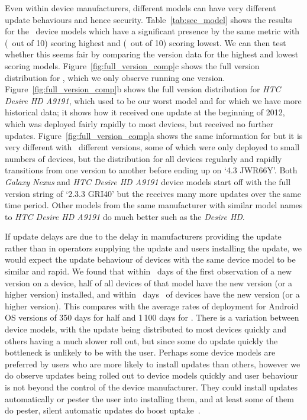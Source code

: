 Even within device manufacturers, different models can have very different update behaviours and hence security.
Table~\ref{tab:sec_model} shows the results for the \daNumSigModels\ device models which have a significant presence by the same metric with \emph{\daSecScoreBestmodel} (\daSecScoreBestmodelScore\ out of 10) scoring highest and \emph{\daSecScoreWorstmodel} (\daSecScoreWorstmodelScore\ out of 10) scoring lowest.
We can then test whether this seems fair by comparing the version data for the highest and lowest scoring models.
Figure~\ref{fig:full_version_comp}c shows the full version distribution for \emph{\daSecScoreWorstmodel}, which we only observe running one version.
Figure~\ref{fig:full_version_comp}b shows the full version distribution for \emph{HTC Desire HD A9191}, which used to be our worst model and for which we have more historical data; it shows how it received one update at the beginning of 2012, which was deployed fairly rapidly to most devices, but received no further updates.
Figure~\ref{fig:full_version_comp}a shows the same information for \emph{\daSecScoreBestmodel} but it is very different with \daSecScoreBestmodelNumFullVersions\ different versions, some of which were only deployed to small numbers of devices, but the distribution for all devices regularly and rapidly transitions from one version to another before ending up on `4.3 JWR66Y'.
Both \emph{Galaxy Nexus} and \emph{HTC Desire HD A9191} device models start off with the full version string of `2.3.3 GRI40' but the \emph{\daSecScoreBestmodel} receives many more updates over the same time period.
Other models from the same manufacturer with similar model names to \emph{HTC Desire HD A9191} do much better such as the \emph{Desire HD}.

If update delays are due to the delay in manufacturers providing the update rather than in operators supplying the update and users installing the update, we would expect the update behaviour of devices with the same device model to be similar and rapid.
We found that within \daModelHalfDeployment\ days of the first observation of a new version on a device, half of all devices of that model have the new version (or a higher version) installed, and within \daModelFullDeployment\ days \daFullDeployedAt\ of devices have the new version (or a higher version).
This compares with the average rates of deployment for Android OS versions of 350 days for half and 1\,100 days for \daFullDeployedAt.
There is a variation between device models, with the update being distributed to most devices quickly and others having a much slower roll out, but since some do update quickly the bottleneck is unlikely to be with the user.
Perhaps some device models are preferred by users who are more likely to install updates than others, however we do observe updates being rolled out to device models quickly and user behaviour is not beyond the control of the device manufacturer.
They could install updates automatically or pester the user into installing them, and at least some of them do pester, silent automatic updates do boost uptake~\cite{Duebendorfer2009}.

